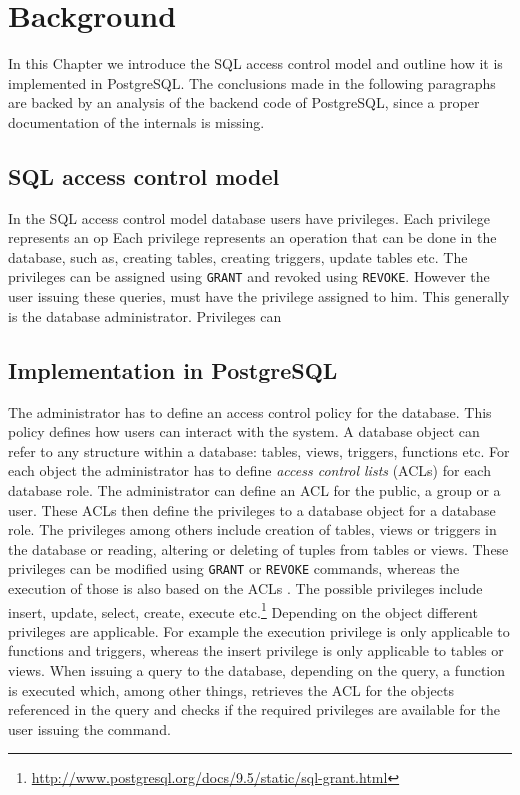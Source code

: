 \section{Background}

In this Chapter we introduce the SQL access control model and outline how it is implemented in PostgreSQL.
%
The conclusions made in the following paragraphs are backed by an analysis of the backend code of PostgreSQL, since a proper documentation of the internals is missing.

\subsection{SQL access control model}


In the SQL access control model database users have privileges. 
%
Each privilege represents an op
%
Each privilege represents an operation that can be done in the database, such as, creating tables, creating triggers, update tables etc.
%
The privileges can be assigned using \texttt{GRANT} and revoked using \texttt{REVOKE}.
%
However the user issuing these queries, must have the privilege assigned to him.
%
This generally is the database administrator.
%
Privileges can 

\subsection{Implementation in PostgreSQL}
The administrator has to define an access control policy for the database. 
%
This policy defines how users can interact with the system.
%
A database object  can refer to any structure within a database: tables, views, triggers, functions etc.
%
For each object the administrator has to define \emph{access control lists} (ACLs) for each database role.
%
The administrator can define an ACL for the public, a group\remark{,} or a user. 
%
These ACLs then define the privileges to a database object for a database role.
%
The privileges among others include creation of tables, views or triggers in the database or reading, altering or deleting of tuples from tables or views.
%
These privileges can be modified using \texttt{GRANT} or \texttt{REVOKE} commands, whereas the execution of those is also based on the ACLs .
%
The possible privileges include insert, update, select, create, execute etc.\footnote{\url{http://www.postgresql.org/docs/9.5/static/sql-grant.html}}
%
Depending on the object different privileges are applicable. 
%
For example the execution privilege is only applicable to functions and triggers, whereas the insert privilege is only applicable to tables or views.
%
When issuing a query to the database, depending on the query, a function is executed which, among other things, retrieves the ACL for the objects referenced in the query and checks if the required privileges are available for the user issuing the command.